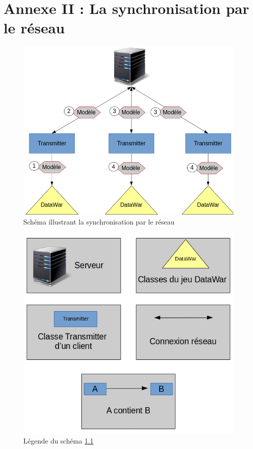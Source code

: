\documentclass[a4paper, titlepage]{livret}
\begin{document}
  \chapter{Annexe II : La synchronisation par le réseau}
  \begin{figure}[th]
      \begin{center}
        \includegraphics[scale=0.3]{Assets/s_r_2.png}
        \caption{Schéma illustrant la synchronisation par le réseau}
        \label{syncros}
      \end{center}
  \end{figure}
  
  \begin{figure}[th]
      \begin{center}
        \includegraphics[scale=0.3]{Assets/l_r_2.png}
        \caption{Légende du schéma \ref{syncros}}
        \label{syncroslegende}
      \end{center}
  \end{figure}
\end{document}
